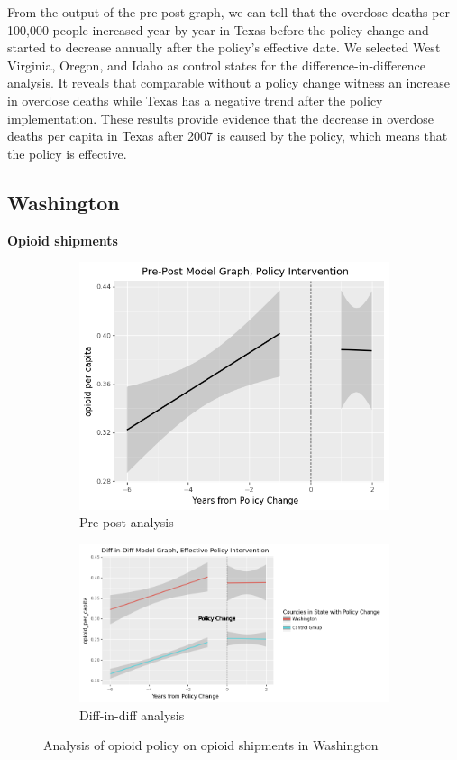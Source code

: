 \documentclass[12pt,letterpaper]{article}
\begin{document}
From the output of the pre-post graph, we can tell that the overdose deaths per 100,000 people increased year by year in Texas before the policy change and started to decrease annually after the policy's effective date. We selected West Virginia, Oregon, and Idaho as control states for the difference-in-difference analysis. It reveals that comparable without a policy change witness an increase in overdose deaths while Texas has a negative trend after the policy implementation. These results provide evidence that the decrease in overdose deaths per capita in Texas after 2007 is caused by the policy, which means that the policy is effective.

\subsection{Washington}
\textbf{Opioid shipments}

\begin{figure}[!h]
\centering
\begin{subfigure}{.5\textwidth}
  \centering
  \includegraphics[width=0.7\linewidth]{../30_results/General_Results/washington_opioid_shipment_prepost.png}
  \caption{Pre-post analysis}
  \label{fig:wa_ship_prepost}
\end{subfigure}%
\begin{subfigure}{.55\textwidth}
  \centering
  \includegraphics[width=1\linewidth]{../30_results/General_Results/washington_opioid_shipment_diffdiff.png}
  \caption{Diff-in-diff analysis}
  \label{fig:wa_ship_did}
\end{subfigure}
\caption{Analysis of opioid policy on opioid shipments in Washington}
\label{fig:wa_ship}
\end{figure}
\end{document}
